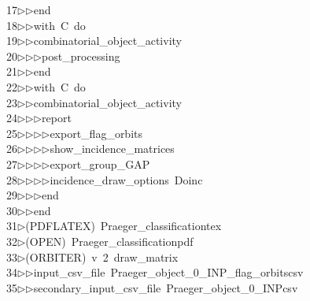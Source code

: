 \begin{tabbing}
17\>$\triangleright$\>$\triangleright$\>end\ \\[0pt]
18\>$\triangleright$\>$\triangleright$\>with\ C\ do\ \\[0pt]
19\>$\triangleright$\>$\triangleright$\>combinatorial\_object\_activity\ \\[0pt]
20\>$\triangleright$\>$\triangleright$\>$\triangleright$\>post\_processing\ \\[0pt]
21\>$\triangleright$\>$\triangleright$\>end\ \\[0pt]
22\>$\triangleright$\>$\triangleright$\>with\ C\ do\ \\[0pt]
23\>$\triangleright$\>$\triangleright$\>combinatorial\_object\_activity\ \\[0pt]
24\>$\triangleright$\>$\triangleright$\>$\triangleright$\>report\ \\[0pt]
25\>$\triangleright$\>$\triangleright$\>$\triangleright$\>$\triangleright$\>export\_flag\_orbits\ \\[0pt]
26\>$\triangleright$\>$\triangleright$\>$\triangleright$\>$\triangleright$\>show\_incidence\_matrices\ \\[0pt]
27\>$\triangleright$\>$\triangleright$\>$\triangleright$\>$\triangleright$\>export\_group\_GAP\ \\[0pt]
28\>$\triangleright$\>$\triangleright$\>$\triangleright$\>$\triangleright$\>incidence\_draw\_options\ Doinc\ \\[0pt]
29\>$\triangleright$\>$\triangleright$\>$\triangleright$\>end\ \\[0pt]
30\>$\triangleright$\>$\triangleright$\>end\\[0pt]
31\>$\triangleright$\>(PDFLATEX)\ Praeger\_classificationtex\\[0pt]
32\>$\triangleright$\>(OPEN)\ Praeger\_classificationpdf\\[0pt]
33\>$\triangleright$\>(ORBITER)\ v\ 2\ draw\_matrix\ \\[0pt]
34\>$\triangleright$\>$\triangleright$\>input\_csv\_file\ Praeger\_object\_0\_INP\_flag\_orbitscsv\ \\[0pt]
35\>$\triangleright$\>$\triangleright$\>secondary\_input\_csv\_file\ Praeger\_object\_0\_INPcsv\ \\[0pt]

\end{tabbing}
